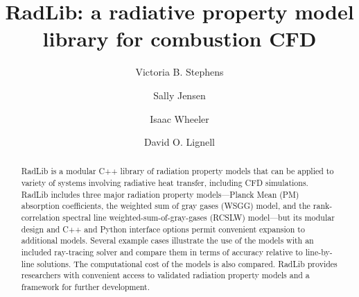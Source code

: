 \documentclass[preprint,12pt]{elsarticle}
\begin{document}
\begin{frontmatter}



\title{RadLib: a radiative property model library for combustion CFD}




\author{Victoria B. Stephens}
\author{Sally Jensen}
\author{Isaac Wheeler}
\author{David O. Lignell}


\address{Department of Chemical Engineering, Brigham Young University, Provo, UT 84602, United States}

\begin{abstract}
RadLib is a modular C++ library of radiation property models that can be applied to variety of systems involving radiative heat transfer, including CFD simulations. RadLib includes three major radiation property models---Planck Mean (PM) absorption coefficients, the weighted sum of gray gases (WSGG) model, and the rank-correlation spectral line weighted-sum-of-gray-gases (RCSLW) model---but its modular design and C++ and Python interface options permit convenient expansion to additional models. Several example cases illustrate the use of the models with an included ray-tracing solver and compare them in terms of accuracy relative to line-by-line solutions. The computational cost of the models is also compared. RadLib provides researchers with convenient access to validated radiation property models and a framework for further development. 
\end{abstract}



\end{frontmatter}
\end{document}

